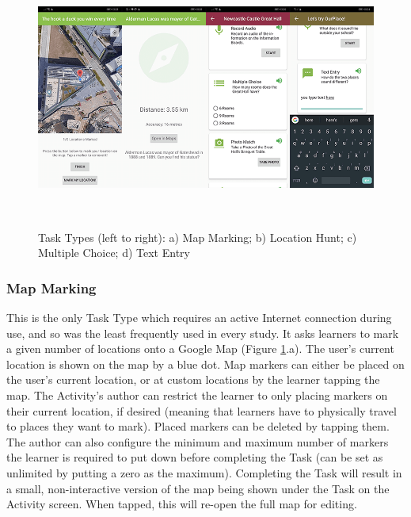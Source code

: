 \begin{figure}
  \centering
  \includegraphics[width=1\columnwidth]{images/chapter05/tasktypes3.png}
  \caption[Task Types (part 3)]{Task Types (left to right): a) Map Marking; b) Location Hunt; c) Multiple Choice; d) Text Entry}~\label{fig:TaskTypes3}
\end{figure}

\subsubsection*{Map Marking}
This is the only Task Type which requires an active Internet connection during use, and so was the least frequently used in every study. It asks learners to mark a given number of locations onto a Google Map (Figure \ref{fig:TaskTypes3}.a). The user's current location is shown on the map by a blue dot. Map markers can either be placed on the user's current location, or at custom locations by the learner tapping the map. The Activity's author can restrict the learner to only placing markers on their current location, if desired (meaning that learners have to physically travel to places they want to mark). Placed markers can be deleted by tapping them. The author can also configure the minimum and maximum number of markers the learner is required to put down before completing the Task (can be set as unlimited by putting a zero as the maximum). Completing the Task will result in a small, non-interactive version of the map being shown under the Task on the Activity screen. When tapped, this will re-open the full map for editing.

